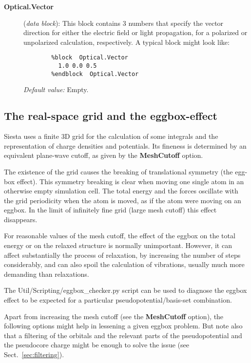 \documentclass[11pt]{article}
\begin{document}
\begin{description}
\item[{\bf Optical.Vector}] ({\it data block}):
This block contains 3 numbers that specify the vector direction
for either the electric field or light propagation, for a polarized
or unpolarized calculation, respectively. A typical block might look
like:

\begin{verbatim}
        %block  Optical.Vector
          1.0 0.0 0.5
        %endblock  Optical.Vector
\end{verbatim}

{\it Default value:} Empty.

\end{description}

\vspace{5pt}
\subsection{The real-space grid and the eggbox-effect}

{\sc Siesta} uses a finite 3D grid for the calculation of some
integrals and the representation of charge densities and potentials. 
Its fineness is determined by an equivalent plane-wave cutoff, as
given by the {\bf MeshCutoff} option.

The existence of the grid causes the breaking of translational
symmetry (the egg-box effect).  This symmetry breaking is clear when
moving one single atom in an otherwise empty simulation cell. The
total energy and the forces oscillate with the grid periodicity when
the atom is moved, as if the atom were moving on an eggbox. In the
limit of infinitely fine grid (large mesh cutoff) this effect
disappears.

For reasonable values of the mesh cutoff, the effect of the eggbox 
on the total energy or on the relaxed structure is normally unimportant.
However, it can affect substantially the process of relaxation, by 
increasing the number of steps considerably, and can also spoil the
calculation of vibrations, usually much more demanding than relaxations.

The Util/Scripting/eggbox\_checker.py script can be used to diagnose
the eggbox effect to be expected for a particular
pseudopotential/basis-set combination.

Apart from increasing the mesh cutoff (see the {\bf MeshCutoff} option),
the following options might help in lessening a given eggbox problem. But
note also that a filtering of the orbitals and the relevant parts of
the pseudopotential and the pseudocore charge might be enough to solve
the issue (see Sect.~\ref{sec:filtering}).
\end{document}
